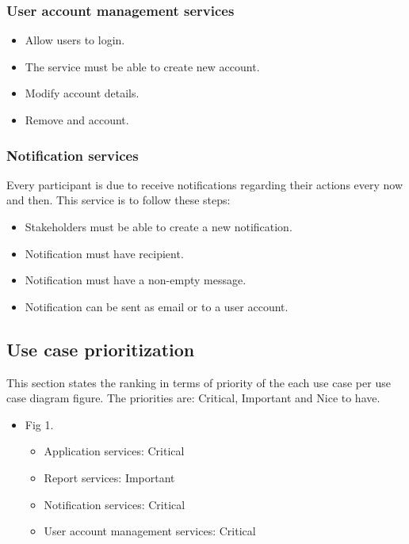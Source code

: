 \documentclass[12pt]{article}
\begin{document}
\subsubsection{User account management services} %
\begin{itemize}
	\item Allow users to login.
	\item The service must be able to create new account.
	\item Modify account details.
	\item Remove and account.
\end{itemize}
\subsubsection{Notification services}
Every participant is due to receive notifications regarding their actions every now and then. This service is to follow these steps:
\begin{itemize}
	\item Stakeholders must be able to create a new notification.
	\item Notification must have recipient.
	\item Notification must have a non-empty message.
	\item Notification can  be sent as email or to a user account.
\end{itemize}
\vspace{0.2in}
\subsection{Use case prioritization} %
\vspace{0.2in}
This section states the ranking in terms of priority of the each use case per use case diagram figure. The priorities are: Critical, Important and Nice to have.\\ 
\begin{itemize}
\item Fig 1.
	\begin{itemize}
		\item Application services: Critical
		\item Report services: Important
		\item Notification services: Critical
		\item User account management services: Critical
	\end{itemize}
\end{itemize}
\end{document}
